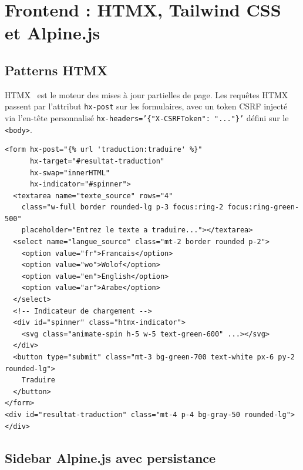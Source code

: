 \documentclass[12pt,a4paper,twoside]{report}
\begin{document}
\section{Frontend : HTMX, Tailwind CSS et Alpine.js}

\subsection{Patterns HTMX}

HTMX~\cite{htmx2024docs} est le moteur des mises à jour partielles de page.
Les requêtes HTMX passent par l'attribut \texttt{hx-post} sur les formulaires,
avec un token CSRF injecté via l'en-tête personnalisé
\texttt{hx-headers='\{"X-CSRFToken": "..."\}'} défini sur le \texttt{<body>}.

\begin{lstlisting}[style=htmlstyle, caption={Formulaire de traduction HTMX --- \texttt{templates/traduction/traduction.html} (extrait)}]
<form hx-post="{% url 'traduction:traduire' %}"
      hx-target="#resultat-traduction"
      hx-swap="innerHTML"
      hx-indicator="#spinner">
  <textarea name="texte_source" rows="4"
    class="w-full border rounded-lg p-3 focus:ring-2 focus:ring-green-500"
    placeholder="Entrez le texte a traduire..."></textarea>
  <select name="langue_source" class="mt-2 border rounded p-2">
    <option value="fr">Francais</option>
    <option value="wo">Wolof</option>
    <option value="en">English</option>
    <option value="ar">Arabe</option>
  </select>
  <!-- Indicateur de chargement -->
  <div id="spinner" class="htmx-indicator">
    <svg class="animate-spin h-5 w-5 text-green-600" ...></svg>
  </div>
  <button type="submit" class="mt-3 bg-green-700 text-white px-6 py-2 rounded-lg">
    Traduire
  </button>
</form>
<div id="resultat-traduction" class="mt-4 p-4 bg-gray-50 rounded-lg"></div>
\end{lstlisting}

\subsection{Sidebar Alpine.js avec persistance}
\end{document}
